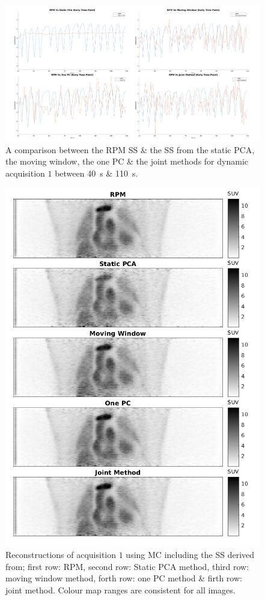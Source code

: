    \begin{figure}
        \centering
        \includegraphics[width=1.0\linewidth]{figures/surrogate_signal.png}
        \captionsetup{singlelinecheck=false, justification=centering}
        \caption{A comparison between the \gls{RPM} \gls{SS} \& the \gls{SS} from the static \gls{PCA}, the moving window, the one \gls{PC} \& the joint methods for dynamic acquisition $1$ between \SI{40}{\second} \& \SI{110}{\second}.}
        \label{fig:surrogate_signal}
    \end{figure}
    
    \begin{figure}
        \centering
        \includegraphics[width=0.75\linewidth]{figures/visual_analysis_pca.png}
        \captionsetup{singlelinecheck=false, justification=centering}
        \caption{Reconstructions of acquisition $1$ using \gls{MC} including the \gls{SS} derived from; first row: \gls{RPM}, second row: Static \gls{PCA} method, third row: moving window method, forth row: one \gls{PC} method \& firth row: joint method. Colour map ranges are consistent for all images.}
        \label{fig:visual_analysis}
    \end{figure}
    
